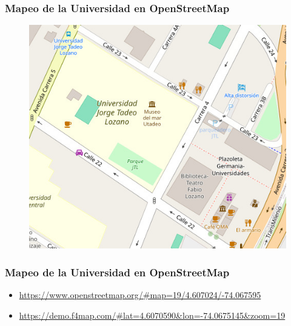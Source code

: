 \documentclass[17pt, t, lualatex]{beamer}
\begin{document}
\begin{frame}
  \frametitle{Mapeo de la Universidad en OpenStreetMap }

  \begin{figure}
    \centering
    \includegraphics[height=0.95\textheight]{img/UAntex.jpg}
  \end{figure}
\end{frame}

\begin{frame}
  \frametitle{Mapeo de la Universidad en OpenStreetMap }

  \begin{itemize}
    \item \url{https://www.openstreetmap.org/\#map=19/4.607024/-74.067595}
    \item \url{https://demo.f4map.com/\#lat=4.6070590&lon=-74.0675145&zoom=19}
  \end{itemize}

\end{frame}
\end{document}
